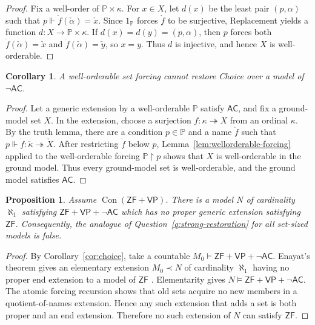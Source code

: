 \documentclass[11pt,a4paper]{amsart}
\newcommand{\VP}{\mathsf{VP}}
\newcommand{\AC}{\mathsf{AC}}
\newcommand{\ZF}{\mathsf{ZF}}
\newcommand{\Con}{\operatorname{Con}}
\theoremstyle{plain}
\newtheorem{proposition}[theorem]{Proposition}
\newtheorem{corollary}[theorem]{Corollary}
\theoremstyle{definition}
\theoremstyle{remark}
\begin{document}
\begin{proof}
Fix a well-order of $\mathbb P\times\kappa$.  For $x\in X$, let $d(x)$ be the least pair $(p,\alpha)$ such that $p\Vdash\dot f(\check\alpha)=\check x$.  Since $1_{\mathbb P}$ forces $\dot f$ to be surjective, Replacement yields a function $d:X\longrightarrow\mathbb P\times\kappa$.
If $d(x)=d(y)=(p,\alpha)$, then $p$ forces both $\dot f(\check\alpha)=\check x$ and $\dot f(\check\alpha)=\check y$, so $x=y$.  Thus $d$ is injective, and hence $X$ is well-orderable.
\end{proof}

\begin{corollary}\label{cor:wellorderable-no-choice-restoration}
A well-orderable set forcing cannot restore Choice over a model of $\neg\AC$.
\end{corollary}

\begin{proof}
Let a generic extension by a well-orderable $\mathbb P$ satisfy $\AC$, and fix a ground-model set $X$.  In the extension, choose a surjection $f:\kappa\twoheadrightarrow X$ from an ordinal $\kappa$.  By the truth lemma, there are a condition $p\in\mathbb P$ and a name $\dot f$ such that $p\Vdash\dot f:\check\kappa\twoheadrightarrow\check X$.  After restricting $\dot f$ below $p$, Lemma~\ref{lem:wellorderable-forcing} applied to the well-orderable forcing $\mathbb P\mathbin{\restriction}p$ shows that $X$ is well-orderable in the ground model.  Thus every ground-model set is well-orderable, and the ground model satisfies $\AC$.
\end{proof}

\begin{proposition}\label{prop:countability-essential}
Assume $\Con(\ZF+\VP)$.  There is a model $N$ of cardinality $\aleph_1$ satisfying $\ZF+\VP+\neg\AC$ which has no proper generic extension satisfying $\ZF$.  Consequently, the analogue of Question~\ref{q:strong-restoration} for all set-sized models is false.
\end{proposition}

\begin{proof}
By Corollary~\ref{cor:choice}, take a countable $M_0\models\ZF+\VP+\neg\AC$.  Enayat's theorem gives an elementary extension $M_0\prec N$ of cardinality $\aleph_1$ having no proper end extension to a model of $\ZF$ \cite[Theorem~5.18]{Enayat}.  Elementarity gives $N\models\ZF+\VP+\neg\AC$.  {The atomic forcing recursion shows that old sets acquire no new members in a quotient-of-names extension.  Hence any such extension that adds a set is both proper and an end extension.}  Therefore no such extension of $N$ can satisfy $\ZF$.
\end{proof}
\endgroup
\end{document}
